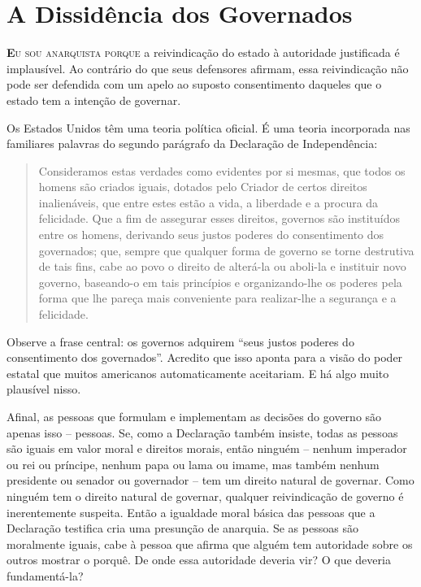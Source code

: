 
\chapter{A Dissidência dos Governados}
\label{chap:1}

\lettrine[lines=2]{\textcolor{LettrineColor}{\textbf{E}}}{u sou anarquista porque} a reivindicação do estado à autoridade justificada é implausível. Ao contrário do que seus defensores afirmam, essa reivindicação não pode ser defendida com um apelo ao suposto consentimento daqueles que o estado tem a intenção de governar.

Os Estados Unidos têm uma teoria política oficial. É uma teoria incorporada nas familiares palavras do segundo parágrafo da Declaração de Independência:

\begin{quote}
Consideramos estas verdades como evidentes por si mesmas, que todos os homens são criados iguais, dotados pelo Criador de certos direitos inalienáveis, que entre estes estão a vida, a liberdade e a procura da felicidade. Que a fim de assegurar esses direitos, governos são instituídos entre os homens, derivando seus justos poderes do consentimento dos governados; que, sempre que qualquer forma de governo se torne destrutiva de tais fins, cabe ao povo o direito de alterá-la ou aboli-la e instituir novo governo, baseando-o em tais princípios e organizando-lhe os poderes pela forma que lhe pareça mais conveniente para realizar-lhe a segurança e a felicidade.
\end{quote}

Observe a frase central: os governos adquirem ``seus justos poderes do consentimento dos governados''. Acredito que isso aponta para a visão do poder estatal que muitos americanos automaticamente aceitariam. E há algo muito plausível nisso.

Afinal, as pessoas que formulam e implementam as decisões do governo são apenas isso -- pessoas. Se, como a Declaração também insiste, todas as pessoas são iguais em valor moral e direitos morais, então ninguém -- nenhum imperador ou rei ou príncipe, nenhum papa ou lama ou imame, mas também nenhum presidente ou senador ou governador -- tem um direito natural de governar. Como ninguém tem o direito natural de governar, qualquer reivindicação de governo é inerentemente suspeita. Então a igualdade moral básica das pessoas que a Declaração testifica cria uma presunção de anarquia. Se as pessoas são moralmente iguais, cabe à pessoa que afirma que alguém tem autoridade sobre os outros mostrar o porquê. De onde essa autoridade deveria vir? O que deveria fundamentá-la?

